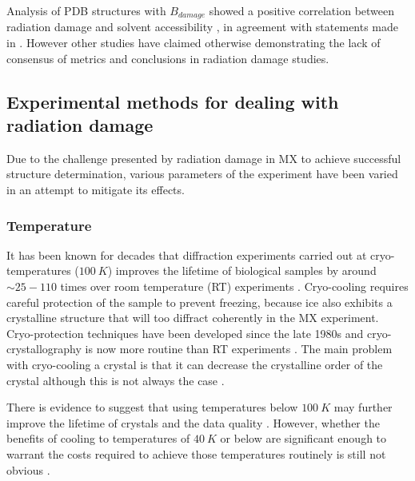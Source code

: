         Analysis of PDB structures with $B_{damage}$ showed a positive correlation between radiation damage and solvent accessibility \cite{gerstel2015identifying}, in agreement with statements made in \cite{sygusch1988}.
		However other studies have claimed otherwise \cite{coquelle2007activity,homer2011energy} demonstrating the lack of consensus of metrics and conclusions in radiation damage studies.

    \subsection{Experimental methods for dealing with radiation damage}
    \label{sub:Experimental methods for dealing with radiation damage}
        Due to the challenge presented by radiation damage in MX to achieve successful structure determination, various parameters of the experiment have been varied in an attempt to mitigate its effects.

        \subsubsection{Temperature}
        \label{subs:Temperature}
            It has been known for decades that diffraction experiments carried out at cryo-temperatures ($100\ K$) improves the lifetime of biological samples \cite{henderson1990cryo,brooks2015nobel} by around $\sim 25 - 110$ times over room temperature (RT) experiments \cite{south2007}.
            Cryo-cooling requires careful protection of the sample to prevent freezing, because ice also exhibits a crystalline structure that will too diffract coherently in the MX experiment.
            Cryo-protection techniques have been developed since the late 1980s \cite{garman1997macromolecular,hope1988cryocrystallography,teng1990mounting} and cryo-crystallography is now more routine than RT experiments \cite{garman2014}.
            The main problem with cryo-cooling a crystal is that it can decrease the crystalline order of the crystal \cite{nave2005} although this is not always the case \cite{garman1999cool}.

            There is evidence to suggest that using temperatures below $100\ K$ may further improve the lifetime of crystals and the data quality \cite{meents2010,teng2002}.
            However, whether the benefits of cooling to temperatures of $40\ K$ or below are significant enough to warrant the costs required to achieve those temperatures routinely is still not obvious \cite{weik2010temperature}.

